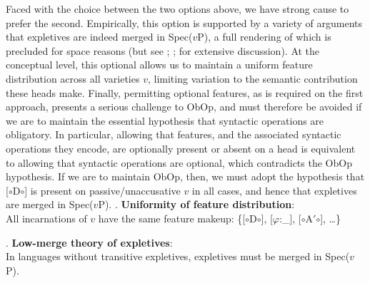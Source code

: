 \documentclass[11pt, letterpaper]{paper_nick}
\newcommand{\fm}[1]{[$\circ$#1$\circ$]}
\begin{document}
Faced with the choice between the two options above, we have strong cause to prefer the second. Empirically, this option is supported by a variety of arguments that expletives are indeed merged in Spec($v$P), a full rendering of which is precluded for space reasons (but see \citealt{richards06}; \citealt{deal09}; \citealt{wu18} for extensive discussion). At the conceptual level, this optional allows us to maintain a uniform feature distribution across all varieties $v$, limiting variation to the semantic contribution these heads make. Finally, permitting optional features, as is required on the first approach, presents a serious challenge to ObOp, and must therefore be avoided if we are to maintain the essential hypothesis that syntactic operations are obligatory. In particular, allowing that features, and the associated syntactic operations they encode, are optionally present or absent on a head is equivalent to allowing that syntactic operations are optional, which contradicts the ObOp hypothesis. If we are to maintain ObOp, then, we must adopt the hypothesis that \fm{D} is present on passive/unaccusative $v$ in all cases, and hence that expletives are merged in Spec($v$P).  
\ex. \textbf{Uniformity of feature distribution}:\\ All incarnations of $v$ have the same feature makeup: \{\fm{D}, [$\varphi$:\_], \fm{A$'$}, \ldots\}

\ex. \textbf{Low-merge theory of expletives}:\\ In languages without transitive expletives, expletives must be merged in Spec($v$P). 
\end{document}
